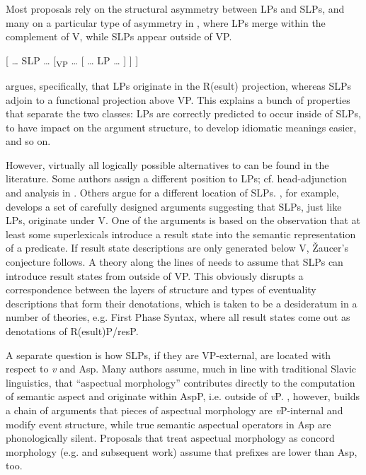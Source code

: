 \documentclass[output=paper,colorlinks,citecolor=brown]{langscibook}
\begin{document}
Most proposals rely on the structural asymmetry between LPs and SLPs, and many on a particular type of asymmetry in , where LPs merge within the complement of V, while SLPs appear outside of VP.

\ea{}   [ … SLP … [\textsubscript{VP} … [ … LP … ] ] ]\label{tat:ex:29}
\z

\noindent \citet{Svenonius2004} argues, specifically, that LPs originate in the R(esult) projection, whereas SLPs adjoin to a functional projection above VP. This explains a bunch of properties that separate the two classes: LPs are correctly predicted to occur inside of SLPs, to have impact on the argument structure, to develop idiomatic meanings easier, and so on. 

However, virtually all logically possible alternatives to  can be found in the literature. Some authors assign a different position to LPs; cf.  head-adjunction and  analysis in . Others argue for a different location of SLPs. \citet{Zaucer2009,Zaucer2010,Zaucer2012}, for example, develops a set of carefully designed arguments suggesting that SLPs, just like LPs, originate under V. One of the arguments is based on the observation that at least some superlexicals introduce a result state into the semantic representation of a predicate. If result state descriptions are only generated below V, Žaucer’s conjecture follows. A theory along the lines of  needs to assume that SLPs can introduce result states from outside of VP. This obviously disrupts a correspondence between the layers of structure and types of eventuality descriptions that form their denotations, which is taken to be a desideratum in a number of theories, e.g.  First Phase Syntax, where all result states come out as denotations of R(esult)P/resP. 

A separate question is how SLPs, if they are VP-external, are located with respect to \textit{v} and Asp. Many authors assume, much in line with traditional Slavic linguistics, that “aspectual morphology” contributes directly to the computation of semantic aspect and originate within AspP, i.e. outside of \textit{v}P. \citet{Tatevosov2011, Tatevosov2015b,Tatevosov2021}, however, builds a chain of arguments that pieces of aspectual morphology are \textit{v}P-internal and modify event structure, while true semantic aspectual operators in Asp are phonologically silent. Proposals that treat aspectual morphology as concord morphology (e.g. \citealt{Arsenijevic2012} and subsequent work) assume that prefixes are lower than Asp, too. 
\end{document}
